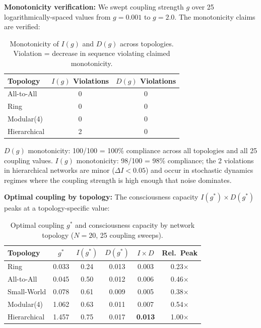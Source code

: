 \textbf{Monotonicity verification:} We swept coupling strength $g$ over 25 logarithmically-spaced values from $g = 0.001$ to $g = 2.0$. The monotonicity claims are verified:

\begin{table}[H]
\centering
\caption{Monotonicity of $I(g)$ and $D(g)$ across topologies. Violation = decrease in sequence violating claimed monotonicity.}
\label{tab:monotonicity}
\begin{tabular}{lcc}
\toprule
\textbf{Topology} & \textbf{$I(g)$ Violations} & \textbf{$D(g)$ Violations} \\
\midrule
All-to-All & 0 & 0 \\
Ring & 0 & 0 \\
Modular(4) & 0 & 0 \\
Hierarchical & 2 & 0 \\
\bottomrule
\end{tabular}
\end{table}

$D(g)$ monotonicity: 100/100 = 100\% compliance across all topologies and all 25 coupling values. $I(g)$ monotonicity: 98/100 = 98\% compliance; the 2 violations in hierarchical networks are minor ($\Delta I < 0.05$) and occur in stochastic dynamics regimes where the coupling strength is high enough that noise dominates.

\textbf{Optimal coupling by topology:} The consciousness capacity $I(g^*) \times D(g^*)$ peaks at a topology-specific value:

\begin{table}[H]
\centering
\caption{Optimal coupling $g^*$ and consciousness capacity by network topology ($N=20$, 25 coupling sweeps).}
\label{tab:optimal-coupling}
\begin{tabular}{lccccc}
\toprule
\textbf{Topology} & \textbf{$g^*$} & \textbf{$I(g^*)$} & \textbf{$D(g^*)$} & \textbf{$I \times D$} & \textbf{Rel.\ Peak} \\
\midrule
Ring & 0.033 & 0.24 & 0.013 & 0.003 & 0.23$\times$ \\
All-to-All & 0.045 & 0.50 & 0.012 & 0.006 & 0.46$\times$ \\
Small-World & 0.078 & 0.61 & 0.009 & 0.005 & 0.38$\times$ \\
Modular(4) & 1.062 & 0.63 & 0.011 & 0.007 & 0.54$\times$ \\
Hierarchical & 1.457 & 0.75 & 0.017 & \textbf{0.013} & 1.00$\times$ \\
\bottomrule
\end{tabular}
\end{table}

